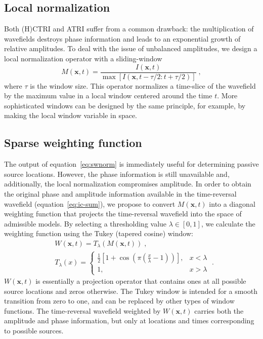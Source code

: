 \subsection{Local normalization}

Both (H)CTRI and ATRI suffer from a common drawback: the multiplication of wavefields destroys phase information and leads to an exponential growth of relative amplitudes. To deal with the issue of unbalanced amplitudes, we design a local normalization operator with a sliding-window 
\begin{equation}
    \label{eq:swnorm}
    M(\mathbf{x},t) =  \frac{I(\mathbf{x},t)}{\max\left[I(\mathbf{x},t-\tau/2:t+\tau/2)\right]} \;,
\end{equation}
where $\tau$ is the window size. This operator normalizes a time-slice of the wavefield by the maximum value in a local window centered around the time $t$. More sophisticated windows can be designed by the same principle, for example, by making the local window variable in space.

\subsection{Sparse weighting function}

The output of equation~\ref{eq:swnorm} is immediately useful for determining passive source locations. However, the phase information is still unavailable and, additionally, the local normalization compromises amplitude. In order to obtain the original phase and amplitude information available in the time-reversal wavefield (equation~\ref{eq:ic-sum}), we propose to convert $M(\mathbf{x},t)$ into a diagonal weighting function that projects the time-reversal wavefield into the space of admissible models. By selecting a thresholding value $\lambda \in [0,1]$, we calculate the weighting function using the Tukey (tapered cosine) window:
\begin{align}
    \label{eq:wt-tukey}
    & W(\mathbf{x},t) = T_{\lambda}(M(\mathbf{x},t)) \;, \\
    & T_{\lambda}(x) =
    \begin{cases}
        \frac{1}{2} \left[ 1+\cos\left(\pi \left( \frac{x}{\lambda} -1 \right) \right) \right], &x<\lambda \\
        1, &x > \lambda
    \end{cases} \;.
\end{align}
$W(\mathbf{x},t)$ is essentially a projection operator that contains ones at all possible source locations and zeros otherwise. The Tukey window is intended for a smooth transition from zero to one, and can be replaced by other types of window functions. The time-reversal wavefield weighted by $W(\mathbf{x},t)$ carries both the amplitude and phase information, but only at locations and times corresponding to possible sources.

